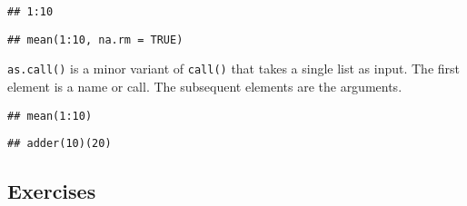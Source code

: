 \begin{verbatim}
## 1:10
\end{verbatim}

\begin{Shaded}
\begin{Highlighting}[]
\NormalTok{(}\NormalTok{, }\NormalTok{(}\OperatorTok{:}\NormalTok{), } \NormalTok{)}
\end{Highlighting}
\end{Shaded}

\begin{verbatim}
## mean(1:10, na.rm = TRUE)
\end{verbatim}

\texttt{as.call()} is a minor variant of \texttt{call()} that takes a
single list as input. The first element is a name or call. The
subsequent elements are the arguments.

\begin{Shaded}
\begin{Highlighting}[]
\NormalTok{(}\NormalTok{(}\NormalTok{(}\OperatorTok{:}\NormalTok{)))}
\end{Highlighting}
\end{Shaded}

\begin{verbatim}
## mean(1:10)
\end{verbatim}

\begin{Shaded}
\begin{Highlighting}[]
\NormalTok{(}\NormalTok{(}\NormalTok{(}\NormalTok{(}\NormalTok{)), }\NormalTok{))}
\end{Highlighting}
\end{Shaded}

\begin{verbatim}
## adder(10)(20)
\end{verbatim}

\hypertarget{exercises-2}{%
\subsection{Exercises}\label{exercises-2}}

